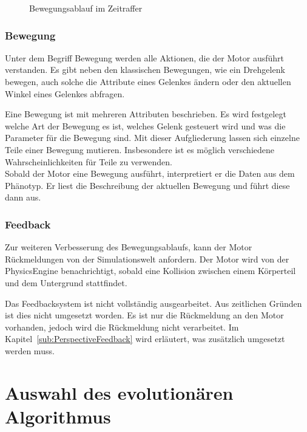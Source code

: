 \begin{figure}[H]
        \caption{Bewegungsablauf im Zeitraffer\label{fig:ConceptMovement}}

      \end{figure}

      \subsubsection{Bewegung\label{subsub:EngineMovement}}

        Unter dem Begriff Bewegung werden alle Aktionen, die der Motor ausführt verstanden.
        Es gibt neben den klassischen Bewegungen, wie ein Drehgelenk bewegen,
        auch solche die Attribute eines Gelenkes ändern oder den aktuellen Winkel eines Gelenkes abfragen.

        \medskip

        Eine Bewegung ist mit mehreren Attributen beschrieben.
        Es wird festgelegt welche Art der Bewegung es ist,
        welches Gelenk gesteuert wird und was die Parameter für die Bewegung sind.
        Mit dieser Aufgliederung lassen sich einzelne Teile einer Bewegung mutieren.
        Insbesondere ist es möglich verschiedene Wahrscheinlichkeiten für Teile zu verwenden.
        \\
        Sobald der Motor eine Bewegung ausführt, interpretiert er die Daten aus dem Phänotyp.
        Er liest die Beschreibung der aktuellen Bewegung und führt diese dann aus.

      \subsubsection{Feedback}

        Zur weiteren Verbesserung des Bewegungsablaufs,
        kann der Motor Rückmeldungen von der Simulationswelt anfordern.
        Der Motor wird von der \gls{PhysicsEngine} benachrichtigt,
        sobald eine Kollision zwischen einem Körperteil und dem Untergrund stattfindet.

        \medskip

        Das Feedbacksystem ist nicht vollständig ausgearbeitet.
        Aus zeitlichen Gründen ist dies nicht umgesetzt worden.
        Es ist nur die Rückmeldung an den Motor vorhanden, jedoch wird die Rückmeldung nicht verarbeitet.
        Im Kapitel~\vref{sub:PerspectiveFeedback} wird erläutert, was zusätzlich umgesetzt werden muss.

  \section{Auswahl des evolutionären Algorithmus}

